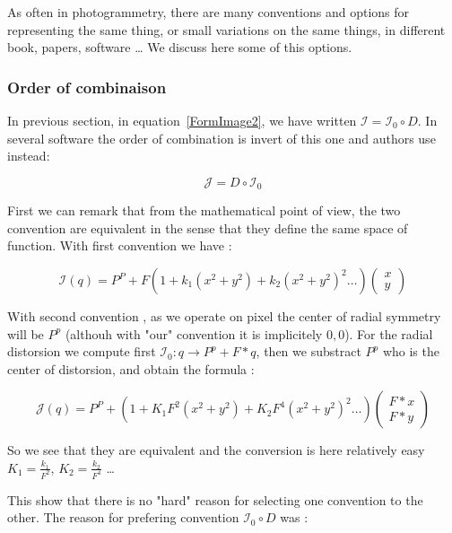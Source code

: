 As often in photogrammetry, there are many conventions and options for representing the same thing,
or small variations on the same things, in different book, papers, software \dots
We discuss here some of this options.


\subsubsection{Order of combinaison}

In previous section, in equation~\ref{FormImage2}, we have written  $ \mathcal{I} = \mathcal{I}_0  \circ D \label{FormImage2}$.
In several software the order of combination is invert of this one and authors use instead:

\begin{equation}
	\mathcal{J} = D \circ  \mathcal{I}_0  
\end{equation}

First we can remark that from the mathematical point of view, the two convention are equivalent in the sense
that they define the same space of function.  With first convention we have :

\begin{equation}
	\mathcal{I}(q) = P^P + F (1 + k_1 (x^2+y^2) +  k_2 (x^2+y^2) ^2 \dots)  \begin{pmatrix} x \\ y \end{pmatrix}
\end{equation}

With second convention , as we operate on pixel the center of radial symmetry will  be $P^p$ 
(althouh with "our" convention it is implicitely $0,0$). For the radial distorsion 
we compute first  $  \mathcal{I}_0 : q \rightarrow  P^p + F*q$, then we substract 
$P^p$  who is the center of distorsion, and obtain the formula :

\begin{equation}
	\mathcal{J}(q) = P^P + (1 + K_1 F^2 (x^2+y^2) +  K_2  F^4 (x^2+y^2) ^2 \dots)  \begin{pmatrix} F*x \\ F*y \end{pmatrix}
\end{equation}

So we see that they are equivalent and the conversion is here relatively easy  $K_1 = \frac{k_1}{F^2} $,
$K_2 = \frac{k_2}{F^4} $ \dots

This show  that there is no "hard" reason for selecting one convention to the other. The reason for
prefering convention  $\mathcal{I}_0  \circ D$ was :


